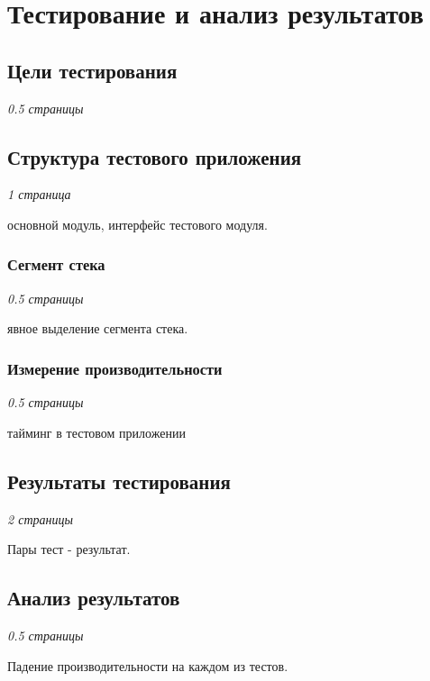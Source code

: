\chapter{Тестирование и анализ результатов}

\section{Цели тестирования}

\textit{0.5 страницы}

\section{Структура тестового приложения}

\textit{1 страница}

основной модуль, интерфейс тестового модуля.

\subsection{Сегмент стека}

\textit{0.5 страницы}

явное выделение сегмента стека.

\subsection{Измерение производительности}

\textit{0.5 страницы}

тайминг в тестовом приложении

\section{Результаты тестирования}

\textit{2 страницы}

Пары тест - результат.

\section{Анализ результатов}

\textit{0.5 страницы}

Падение производительности на каждом из тестов.
